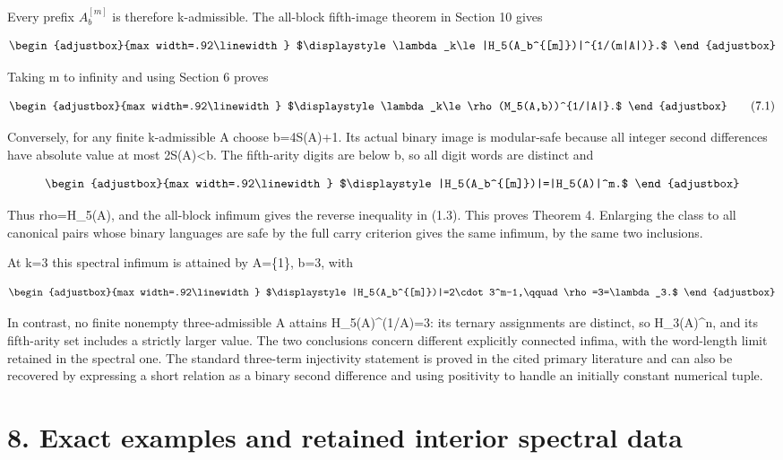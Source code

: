 Every prefix \(A_b^{[m]}\) is therefore k-admissible. The all-block fifth-image theorem in Section 10 gives

\[
\begin{adjustbox}{max width=.92\linewidth}
$\displaystyle \lambda_k\le |H_5(A_b^{[m]})|^{1/(m|A|)}.$
\end{adjustbox}
\]

Taking m to infinity and using Section 6 proves

\[
\begin{adjustbox}{max width=.92\linewidth}
$\displaystyle \lambda_k\le\rho(M_5(A,b))^{1/|A|}.$
\end{adjustbox}
\tag{7.1}
\]

Conversely, for any finite k-admissible A choose b=4S(A)+1. Its actual binary image is modular-safe because all integer second differences have absolute value at most 2S(A)\textless b. The fifth-arity digits are below b, so all digit words are distinct and

\[
\begin{adjustbox}{max width=.92\linewidth}
$\displaystyle |H_5(A_b^{[m]})|=|H_5(A)|^m.$
\end{adjustbox}
\]

Thus rho=\textbar H\_5(A)\textbar, and the all-block infimum gives the reverse inequality in (1.3). This proves Theorem 4. Enlarging the class to all canonical pairs whose binary languages are safe by the full carry criterion gives the same infimum, by the same two inclusions.

At k=3 this spectral infimum is attained by A=\{1\}, b=3, with

\[
\begin{adjustbox}{max width=.92\linewidth}
$\displaystyle |H_5(A_b^{[m]})|=2\cdot3^m-1,\qquad\rho=3=\lambda_3.$
\end{adjustbox}
\]

In contrast, no finite nonempty three-admissible A attains \textbar H\_5(A)\textbar\^{}(1/\textbar A\textbar)=3: its ternary assignments are distinct, so \textbar H\_3(A)\^{}n, and its fifth-arity set includes a strictly larger value. The two conclusions concern different explicitly connected infima, with the word-length limit retained in the spectral one. The standard three-term injectivity statement is proved in the cited primary literature and can also be recovered by expressing a short relation as a binary second difference and using positivity to handle an initially constant numerical tuple.

\section{8. Exact examples and retained interior spectral data}\label{n24-exact-examples-and-retained-interior-spectral-data}

